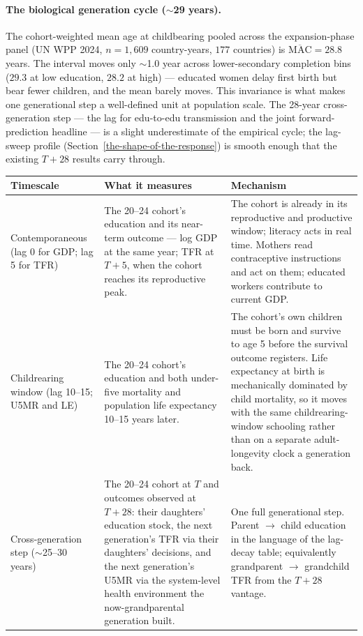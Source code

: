 \documentclass[12pt,letterpaper]{article}
\begin{document}
\paragraph{The biological generation cycle ($\sim$29 years).} The
cohort-weighted mean age at childbearing pooled across the
expansion-phase panel (UN WPP 2024, $n=1{,}609$ country-years, $177$
countries) is $\overline{\mathrm{MAC}} = 28.8$ years. The interval
moves only $\sim$1.0 year across lower-secondary completion bins
($29.3$ at low education, $28.2$ at high) --- educated women delay
first birth but bear fewer children, and the mean barely moves. This
invariance is what makes one generational step a well-defined unit
at population scale. The 28-year cross-generation step --- the lag for
edu-to-edu transmission and the joint forward-prediction headline --- is a
slight underestimate of the empirical cycle; the lag-sweep profile
(Section~\ref{the-shape-of-the-response})
is smooth enough that the existing $T{+}28$ results carry through.

\begin{center}
\footnotesize
\begin{tabular}{@{}p{3.4cm}p{4.2cm}p{6.7cm}@{}}
\toprule
Timescale & What it measures & Mechanism \\
\midrule
Contemporaneous (lag 0 for GDP; lag 5 for TFR) &
The 20--24 cohort's education and its near-term outcome ---
log GDP at the same year; TFR at $T{+}5$, when the cohort
reaches its reproductive peak. &
The cohort is already in its reproductive and productive window;
literacy acts in real time. Mothers read contraceptive instructions
and act on them; educated workers contribute to current GDP. \\
\addlinespace
Childrearing window (lag 10--15; U5MR and LE) &
The 20--24 cohort's education and both under-five mortality and
population life expectancy 10--15 years later. &
The cohort's own children must be born and survive to age 5 before
the survival outcome registers. Life expectancy at birth is
mechanically dominated by child mortality, so it moves with the same
childrearing-window schooling rather than on a separate adult-longevity
clock a generation back. \\
\addlinespace
Cross-generation step ($\sim$25--30 years) &
The 20--24 cohort at $T$ and outcomes observed at $T{+}28$: their
daughters' education stock, the next generation's TFR via their
daughters' decisions, and the next generation's U5MR via the
system-level health environment the now-grandparental generation
built. &
One full generational step. Parent $\to$ child education in the
language of the lag-decay table; equivalently grandparent $\to$
grandchild TFR from the $T{+}28$ vantage. \\
\bottomrule
\end{tabular}
\end{center}
\end{document}
